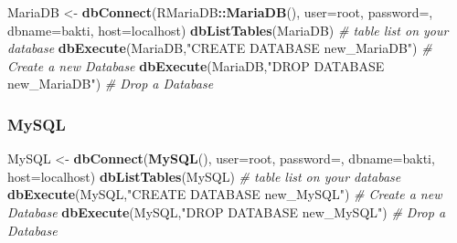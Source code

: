 \documentclass[
]{book}
\newenvironment{Shaded}{\begin{snugshade}}{\end{snugshade}}
\newcommand{\AttributeTok}[1]{\textcolor[rgb]{0.13,0.29,0.53}{#1}}
\newcommand{\CommentTok}[1]{\textcolor[rgb]{0.56,0.35,0.01}{\textit{#1}}}
\newcommand{\FunctionTok}[1]{\textcolor[rgb]{0.13,0.29,0.53}{\textbf{#1}}}
\newcommand{\NormalTok}[1]{#1}
\newcommand{\OtherTok}[1]{\textcolor[rgb]{0.56,0.35,0.01}{#1}}
\newcommand{\SpecialCharTok}[1]{\textcolor[rgb]{0.81,0.36,0.00}{\textbf{#1}}}
\newcommand{\StringTok}[1]{\textcolor[rgb]{0.31,0.60,0.02}{#1}}
\begin{document}
\begin{Shaded}
\begin{Highlighting}[]
\NormalTok{MariaDB }\OtherTok{\textless{}{-}} \FunctionTok{dbConnect}\NormalTok{(RMariaDB}\SpecialCharTok{::}\FunctionTok{MariaDB}\NormalTok{(), }
                  \AttributeTok{user=}\StringTok{\textquotesingle{}root\textquotesingle{}}\NormalTok{,}
                  \AttributeTok{password=}\StringTok{\textquotesingle{}\textquotesingle{}}\NormalTok{, }
                  \AttributeTok{dbname=}\StringTok{\textquotesingle{}bakti\textquotesingle{}}\NormalTok{, }
                  \AttributeTok{host=}\StringTok{\textquotesingle{}localhost\textquotesingle{}}\NormalTok{)}
\FunctionTok{dbListTables}\NormalTok{(MariaDB)                             }\CommentTok{\# table list on your database}
\FunctionTok{dbExecute}\NormalTok{(MariaDB,}\StringTok{"CREATE DATABASE new\_MariaDB"}\NormalTok{)  }\CommentTok{\# Create a new Database}
\FunctionTok{dbExecute}\NormalTok{(MariaDB,}\StringTok{"DROP DATABASE new\_MariaDB"}\NormalTok{)    }\CommentTok{\# Drop a Database}
\end{Highlighting}
\end{Shaded}

\hypertarget{mysql}{%
\subsubsection*{MySQL}\label{mysql}}

\begin{Shaded}
\begin{Highlighting}[]
\NormalTok{MySQL }\OtherTok{\textless{}{-}} \FunctionTok{dbConnect}\NormalTok{(}\FunctionTok{MySQL}\NormalTok{(), }
                  \AttributeTok{user=}\StringTok{\textquotesingle{}root\textquotesingle{}}\NormalTok{,}
                  \AttributeTok{password=}\StringTok{\textquotesingle{}\textquotesingle{}}\NormalTok{, }
                  \AttributeTok{dbname=}\StringTok{\textquotesingle{}bakti\textquotesingle{}}\NormalTok{, }
                  \AttributeTok{host=}\StringTok{\textquotesingle{}localhost\textquotesingle{}}\NormalTok{)}
\FunctionTok{dbListTables}\NormalTok{(MySQL)                               }\CommentTok{\# table list on your database}
\FunctionTok{dbExecute}\NormalTok{(MySQL,}\StringTok{"CREATE DATABASE new\_MySQL"}\NormalTok{)      }\CommentTok{\# Create a new Database}
\FunctionTok{dbExecute}\NormalTok{(MySQL,}\StringTok{"DROP DATABASE new\_MySQL"}\NormalTok{)        }\CommentTok{\# Drop a Database}
\end{Highlighting}
\end{Shaded}
\end{document}
